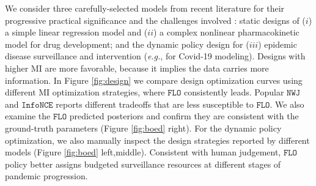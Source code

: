 \documentclass{article}
\theoremstyle{plain}
\theoremstyle{definition}
\theoremstyle{remark}
\newcommand{\infonce}{\texttt{InfoNCE}}
\newcommand{\NWJ}{\texttt{NWJ}}
\newcommand{\DV}{\texttt{DV}}
\newcommand{\MINE}{\texttt{MINE}}
\newcommand{\FLO}{\texttt{FLO}}
\begin{document}
		We consider three carefully-selected models from recent literature for their progressive practical significance and the challenges involved \citep{foster2021deep, ivanova2021implicit, kleinegesse2021sequential}: static designs of ($i$) a simple linear regression model and ($ii$) a complex nonlinear pharmacokinetic model for drug development; and the dynamic policy design for ($iii$) epidemic disease surveillance and intervention ({\it e.g.}, for Covid-19 modeling). Designs with higher MI are more favorable, because it implies the data carries more information. In Figure \ref{fig:design} we compare design optimization curves using different MI optimization strategies, where $\FLO$ consistently leads. Popular $\NWJ$ and $\infonce$ reports different tradeoffs that are less susceptible to $\FLO$. We also examine the $\FLO$ predicted posteriors and confirm they are consistent with the ground-truth parameters (Figure \ref{fig:boed} right). For the dynamic policy optimization, we also manually inspect the design strategies reported by different models (Figure \ref{fig:boed} left,middle). Consistent with human judgement, $\FLO$ policy better assigns budgeted surveillance resources at different stages of pandemic progression. 
		
		
		
		
		
\end{document}
